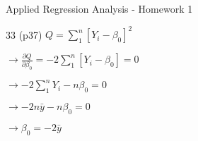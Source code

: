 \documentclass[11pt]{article}
\begin{document}
\begin{frame}[label={sec:orgb1fb7b8},fragile]{Applied Regression Analysis - Homework 1}
\begin{block}{33 (p37)}
\(Q = \sum_1^n [Y_i - \beta_0]^2\)

\(\to \frac{\partial Q}{\partial \beta_0} = -2 \sum_1^n [Y_i - \beta_0] = 0\)

\(\to -2 \sum_1^n Y_i - n \beta_0 = 0\)

\(\to -2 n \bar{y} - n \beta_0 = 0\)

\(\to \beta_0 = -2 \bar{y}\)
\end{block}
\end{frame}
\end{document}
